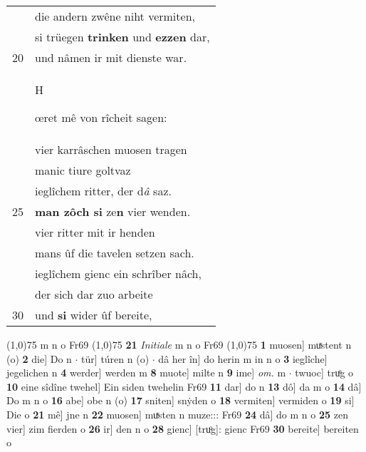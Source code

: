 \documentclass[8pt,a4paper,notitlepage]{article}
\begin{document}
\begin{table}[ht]
\begin{minipage}[t]{0.5\linewidth}
\begin{tabular}{rl}
 & die andern zwêne niht vermiten,\\ 
 & si trüegen \textbf{trinken} und \textbf{ezzen} dar,\\ 
20 & und nâmen ir mit dienste war.\\ 
 & \begin{large}H\end{large}œret mê von rîcheit sagen:\\ 
 & vier karrâschen muosen tragen\\ 
 & manic tiure goltvaz\\ 
 & ieglîchem ritter, der d\textit{â} saz.\\ 
25 & \textbf{man zôch si} ze\textbf{n} vier wenden.\\ 
 & vier ritter mit ir henden\\ 
 & mans ûf die tavelen setzen sach.\\ 
 & ieglîchem gienc ein schrîber nâch,\\ 
 & der sich dar zuo arbeite\\ 
30 & und \textbf{si} wider ûf bereite,\\ 
\end{tabular}
\scriptsize
\line(1,0){75} \newline
m n o Fr69 \newline
\line(1,0){75} \newline
\textbf{21} \textit{Initiale} m n o Fr69  \newline
\line(1,0){75} \newline
\textbf{1} muosen] muͯstent n (o) \textbf{2} die] Do n  $\cdot$ tür] túren n (o)  $\cdot$ dâ her în] do herin m in n o \textbf{3} ieglîche] jegelichen n \textbf{4} werder] werden m \textbf{8} muote] milte n \textbf{9} ime] \textit{om.} m  $\cdot$ twuoc] truͦg o \textbf{10} eine sîdîne twehel] Ein siden twehelin Fr69 \textbf{11} dar] do n \textbf{13} dô] da m o \textbf{14} dâ] Do m n o \textbf{16} abe] obe n (o) \textbf{17} sniten] snẏden o \textbf{18} vermiten] vermiden o \textbf{19} si] Die o \textbf{21} mê] jne n \textbf{22} muosen] muͯsten n muze::: Fr69 \textbf{24} dâ] do m n o \textbf{25} zen vier] zim fierden o \textbf{26} ir] den n o \textbf{28} gienc] [truͦg]: gienc Fr69 \textbf{30} bereite] bereiten o \newline
\end{minipage}
\end{table}
\newpage
\end{document}

